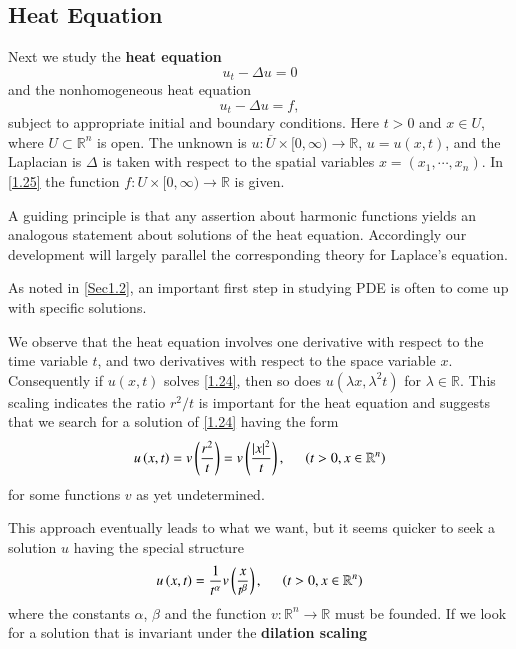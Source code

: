 \subsection{Heat Equation}\label{Sec1.3}
Next we study the \textbf{heat equation}
\begin{equation}\label{1.24}
u_t-\Delta u=0
\end{equation}
and the nonhomogeneous heat equation 
\begin{equation}\label{1.25}
u_t-\Delta u=f,
\end{equation}
subject to appropriate initial and boundary conditions. Here $t>0$ and $x\in U$, where $U\subset\mathbb{R}^n$ is open. The unknown is $u:\overline{U}\times[0,\infty)\to\mathbb{R}$, $u=u(x,t)$, and the Laplacian is $\Delta$ is taken with respect to the spatial variables $x=(x_1,\cdots,x_n)$. In \eqref{1.25} the function $f:U\times[0,\infty)\to\mathbb{R}$ is given.\par
A guiding principle is that any assertion about harmonic functions yields an analogous statement about solutions of the heat equation. Accordingly our development will largely parallel the corresponding theory for Laplace's equation.\par
As noted in \ref{Sec1.2}, an important first step in studying PDE is often to come up with specific solutions.\par
We observe that the heat equation involves one derivative with respect to the time variable $t$, and two derivatives with respect to the space variable $x$. Consequently if $u(x,t)$ solves \eqref{1.24}, then so does $u(\lambda x,\lambda^2t)$ for $\lambda\in\mathbb{R}$. This scaling indicates the ratio $r^2/t$ is important for the heat equation and suggests that we search for a solution of \eqref{1.24} having the form 
$$
u\left( x,t \right) =v\left( \frac{r^2}{t} \right) =v\left( \frac{\left| x \right|^2}{t} \right) ,\hspace{0.5cm}\left( t>0,x\in \mathbb{R} ^n \right) 
$$
for some functions $v$ as yet undetermined.\par
This approach eventually leads to what we want, but it seems quicker to seek a solution $u$ having the special structure 
\begin{equation}\label{1.26}
u\left( x,t \right) =\frac{1}{t^{\alpha}}v\left( \frac{x}{t^{\beta}} \right) ,\hspace{0.5cm}\left( t>0,x\in \mathbb{R} ^n \right) 
\end{equation}
where the constants $\alpha$, $\beta$ and the function $v:\mathbb{R}^n\to\mathbb{R}$ must be founded. If we look for a solution that is invariant under the \textbf{dilation scaling} 
